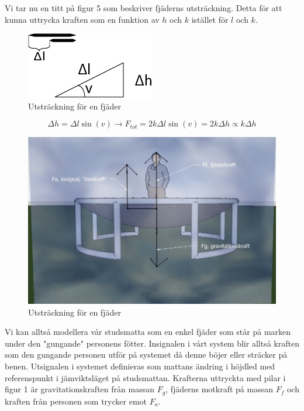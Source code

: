 \documentclass[10pt,a4paper]{article}
\begin{document}
\pagebreak
Vi tar nu en titt på figur 5 som beskriver fjäderns utsträckning. Detta för att kunna uttrycka kraften som en funktion av $h$ och $k$ istället för $l$ och $k$.

\begin{figure}[ht]
\begin{center}
\includegraphics[scale=0.5]{utstrackning}
\caption{Utsträckning för en fjäder}
\end{center}
\end{figure}

$$\Delta h = \Delta l \sin(v) \rightarrow F_{tot}=2k\Delta l \sin(v)=2k\Delta h\propto k\Delta h $$

\begin{figure}[ht]
\begin{center}
\includegraphics[scale=0.5]{BildKrafter}
\caption{Utsträckning för en fjäder}
\end{center}
\end{figure}

Vi kan alltså modellera vår studsmatta som en enkel fjäder som står på marken under den "gungande" personens fötter.
Insignalen i vårt system blir alltså kraften som den gungande personen utför på systemet då denne böjer eller sträcker på benen. Utsignalen i systemet definieras som mattans ändring i höjdled med referenspunkt i jämviktsläget på studsmattan. 
Krafterna uttryckta med pilar i figur 1 är gravitationskraften från massan $F_g$, fjäderns motkraft på massan $F_f$ och kraften från personen som trycker emot $F_a$.
\end{document}

